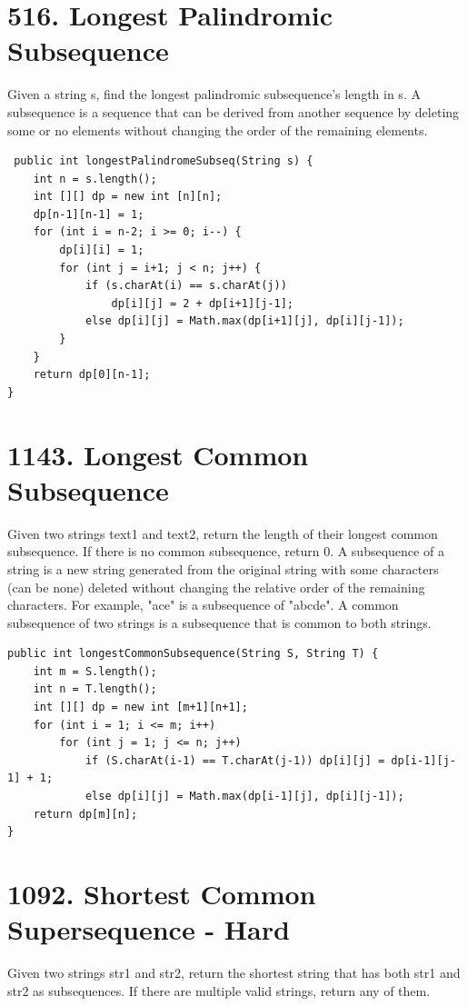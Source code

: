 \documentclass[9pt, b5paaper]{book}
\begin{document}
\section{516. Longest Palindromic Subsequence}
\label{sec-1-30}
Given a string s, find the longest palindromic subsequence's length in s.
A subsequence is a sequence that can be derived from another sequence by deleting some or no elements without changing the order of the remaining elements.
\begin{verbatim}
 public int longestPalindromeSubseq(String s) {
    int n = s.length();
    int [][] dp = new int [n][n];
    dp[n-1][n-1] = 1;
    for (int i = n-2; i >= 0; i--) {
        dp[i][i] = 1;
        for (int j = i+1; j < n; j++) {
            if (s.charAt(i) == s.charAt(j))
                dp[i][j] = 2 + dp[i+1][j-1];
            else dp[i][j] = Math.max(dp[i+1][j], dp[i][j-1]);
        }
    }
    return dp[0][n-1];
}
\end{verbatim}

\section{1143. Longest Common Subsequence}
\label{sec-1-31}
Given two strings text1 and text2, return the length of their longest common subsequence. If there is no common subsequence, return 0.
A subsequence of a string is a new string generated from the original string with some characters (can be none) deleted without changing the relative order of the remaining characters.
For example, "ace" is a subsequence of "abcde".
A common subsequence of two strings is a subsequence that is common to both strings.
\begin{verbatim}
public int longestCommonSubsequence(String S, String T) {
    int m = S.length();
    int n = T.length();
    int [][] dp = new int [m+1][n+1];
    for (int i = 1; i <= m; i++) 
        for (int j = 1; j <= n; j++) 
            if (S.charAt(i-1) == T.charAt(j-1)) dp[i][j] = dp[i-1][j-1] + 1;
            else dp[i][j] = Math.max(dp[i-1][j], dp[i][j-1]);
    return dp[m][n];
}
\end{verbatim}

\section{1092. Shortest Common Supersequence - Hard}
\label{sec-1-32}
Given two strings str1 and str2, return the shortest string that has both str1 and str2 as subsequences. If there are multiple valid strings, return any of them.
\end{document}
